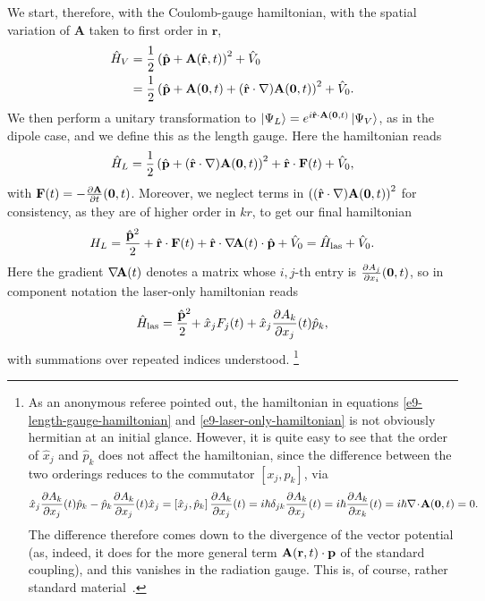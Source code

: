 We start, therefore, with the Coulomb-gauge hamiltonian, with the spatial variation of $\mathbf A$ taken to first order in $\mathbf r$,
\begin{align}
\hat H_V & = \frac 12\left(\hat {\vb{p}}+\vb{A}(\hat {\vb{r}},t)\right)^2+\hat V_0
 \\ & = \frac 12\left(\hat {\vb{p}}+\vb{A}(\vb 0,t)+(\hat {\vb{r}}\cdot\nabla)\vb{A}(\vb0,t)\right)^2+\hat V_0.
\end{align}
We then perform a unitary transformation to $\ket{\Psi_L}=e^{i\hat {\vb{r}}\cdot \vb{A}(\vb0,t)} \ket{\Psi_V}$, as in the dipole case, and we define this as the length gauge. Here the hamiltonian reads
\begin{equation}
\hat H_L = \frac 12\left(\hat {\vb{p}}+(\hat {\vb{r}}\cdot\nabla)\vb{A}(\vb0,t)\right)^2+\hat {\vb{r}}\cdot\vb{F}(t)+\hat V_0,
\end{equation}
with $\vb{F}(t)=-\tfrac{\partial\vb{A}}{\partial t}(\vb0,t)$. Moreover, we neglect terms in $\left((\hat {\vb{r}}\cdot\nabla)\vb{A}(\vb0,t)\right)^2$ for consistency, 
as they are of higher order in $kr$, to get our final hamiltonian
\begin{equation}
H_L = \frac{\hat{\vb{p}}^2}{2} + \hat {\vb{r}}\cdot\vb{F}(t) + \hat{\vb{r}}\cdot\nabla\!\vb{A}(t)\cdot\hat{\vb{p}} + \hat V_0
 = \hat H_\mathrm{las}+\hat V_0.
\label{e9-length-gauge-hamiltonian}
\end{equation}
Here the gradient $\nabla\!\vb{A}(t)$ denotes a matrix whose $i,j$-th entry is $\frac{\partial A_j}{\partial x_i}(\vb0,t)$, so in 
component notation the laser-only hamiltonian reads
\begin{equation}
\hat H_\mathrm{las} = \frac{\hat{\vb{p}}^2 \!\! }{2}+\hat x_jF_j(t)+\hat x_j\frac{\partial A_k}{\partial x_j}(t)\hat p_k,
\label{e9-laser-only-hamiltonian}
\end{equation}
with summations over repeated indices understood.%
\footnote{%
As an anonymous referee pointed out, the hamiltonian in equations \eqref{e9-length-gauge-hamiltonian} and \eqref{e9-laser-only-hamiltonian} is not obviously hermitian at an initial glance. However, it is quite easy to see that the order of $\hat x_j$ and $\hat p_k$ does not affect the hamiltonian, since the difference between the two orderings reduces to the commutator $[x_j,p_k]$, via
$$
\hat x_j\frac{\partial A_k}{\partial x_j}(t)\hat p_k - \hat p_k\frac{\partial A_k}{\partial x_j}(t)\hat x_j
= \left[ \hat x_j , \hat p_k\right] \frac{\partial A_k}{\partial x_j}(t)
=i\hbar\delta_{jk} \frac{\partial A_k}{\partial x_j}(t) 
= i \hbar \frac{\partial A_k}{\partial x_k}(t) 
= i\hbar \nabla \!\cdot\! \vb{A}(\vb0,t) = 0.$$
The difference therefore comes down to the divergence of the vector potential (as, indeed, it does for the more general term $\vb{A}(\vb{r},t)\cdot\vb{p}$ of the standard coupling), and this vanishes in the radiation gauge. This is, of course, rather standard material~\cite{cohen-tannoudji_photons-and-atoms}.
}




